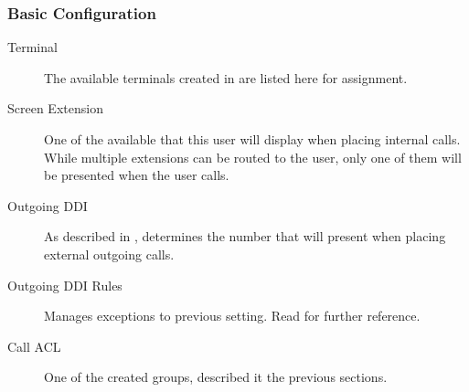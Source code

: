 \documentclass[letterpaper,10pt,spanish]{sphinxmanual}
\begin{document}
\subsubsection{Basic Configuration}
\label{administration_portal/client/vpbx/users:basic-configuration}\begin{description}
\item[{Terminal}] \leavevmode{}\label{administration_portal/client/vpbx/users:term-terminal}
The available terminals created in {\hyperref[administration_portal/client/vpbx/terminals:terminals]{}} are listed here
for assignment.

\item[{Screen Extension}] \leavevmode{}\label{administration_portal/client/vpbx/users:term-screen-extension}
One of the available {\hyperref[administration_portal/client/vpbx/extensions:extensions]{}} that this user will display when
placing internal calls. While multiple extensions can be routed to the
user, only one of them will be presented when the user calls.

\item[{Outgoing DDI}] \leavevmode{}\label{administration_portal/client/vpbx/users:term-outgoing-ddi}
As described in {\hyperref[getting_started/external_outgoing_calls/outgoing_ddi:external\string-ddi]{}}, determines the number that will
present when placing external outgoing calls.

\item[{Outgoing DDI Rules}] \leavevmode{}\label{administration_portal/client/vpbx/users:term-outgoing-ddi-rules}
Manages exceptions to previous setting. Read {\hyperref[administration_portal/client/vpbx/user_configuration/outgoing_ddi_rules:outgoingddi\string-rules]{}}
for further reference.

\item[{Call ACL}] \leavevmode{}\label{administration_portal/client/vpbx/users:term-call-acl}
One of the created {\hyperref[administration_portal/client/vpbx/user_configuration/call_acls:call\string-permissions]{}} groups, described
it the previous sections.


\end{description}
\end{document}
